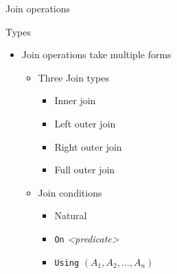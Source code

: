 \documentclass[aspectratio=169, xcolor=dvipsnames]{beamer}
\begin{document}
\begin{frame}{Join operations}
    \begin{block}{Types}
        \begin{itemize}[<+->]
            \item Join operations take multiple forms
            \begin{itemize}
                \item[$\triangleright$] Three Join types
                \begin{itemize}
                    \item Inner join
                    \item Left outer join
                    \item Right outer join
                    \item Full outer join
                \end{itemize}
                \item[$\triangleright$] Join conditions
                \begin{itemize}
                    \item Natural
                    \item \texttt{On} \textit{<predicate>}
                    \item \texttt{Using} $(A_1,A_2, \dots ,A_n)$
                \end{itemize}
            \end{itemize}
        \end{itemize}
    \end{block}
\end{frame}
\end{document}
